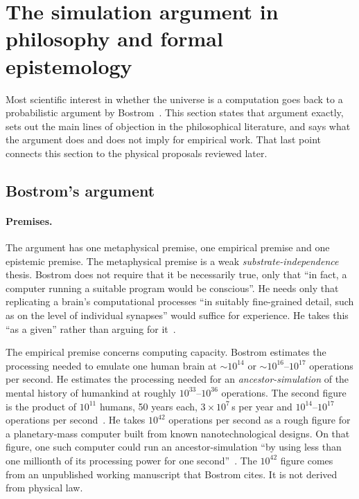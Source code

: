 \section{The simulation argument in philosophy and formal epistemology}
\label{sec:philosophy}

Most scientific interest in whether the universe is a computation goes back to a
probabilistic argument by Bostrom~\cite{Bostrom2003are}. This section states that
argument exactly, sets out the main lines of objection in the philosophical literature,
and says what the argument does and does not imply for empirical work. That last point
connects this section to the physical proposals reviewed later.

\subsection{Bostrom's argument}
\label{sec:philosophy:bostrom}

\paragraph{Premises.}
The argument has one metaphysical premise, one empirical premise and one epistemic
premise. The metaphysical premise is a weak \emph{substrate-independence} thesis. Bostrom
does not require that it be necessarily true, only that ``in fact, a computer running a
suitable program would be conscious''. He needs only that replicating a brain's
computational processes ``in suitably fine-grained detail, such as on the level of
individual synapses'' would suffice for experience. He takes this ``as a given'' rather
than arguing for it~\cite[\S\,II]{Bostrom2003are}.

The empirical premise concerns computing capacity. Bostrom estimates the processing needed
to emulate one human brain at ${\sim}10^{14}$ or ${\sim}10^{16}$--$10^{17}$ operations
per second. He estimates the processing needed for an \emph{ancestor-simulation} of the
mental history of humankind at roughly $10^{33}$--$10^{36}$ operations. The second figure
is the product of $10^{11}$ humans, 50 years each, $3\times10^{7}$\,s per year and
$10^{14}$--$10^{17}$ operations per second~\cite[\S\,III and fn.~10]{Bostrom2003are}. He
takes $10^{42}$ operations per second as a rough figure for a planetary-mass computer
built from known nanotechnological designs. On that figure, one such computer could run
an ancestor-simulation ``by using less than one millionth of its processing power for
one second''~\cite[\S\,III]{Bostrom2003are}. The $10^{42}$ figure comes from an unpublished
working manuscript that Bostrom cites. It is not derived from physical law.

